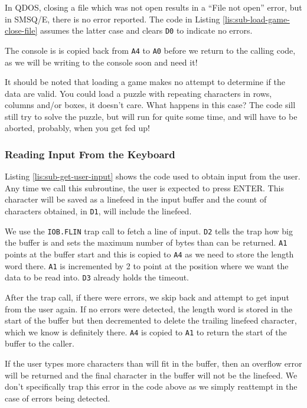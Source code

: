 In QDOS, closing a file which was not open results in a ``File not
open'' error, but in SMSQ/E, there is no error reported. The code
in Listing \ref{lis:sub-load-game-close-file} assumes the latter
case and clears \texttt{D0} to indicate no errors.

The console is is copied back from \texttt{A4} to \texttt{A0} before
we return to the calling code, as we will be writing to the console
soon and need it!

It should be noted that loading a game makes no attempt to determine
if the data are valid. You could load a puzzle with repeating characters
in rows, columns and/or boxes, it doesn't care. What happens in this
case? The code sill still try to solve the puzzle, but will run for
quite some time, and will have to be aborted, probably, when you get
fed up!

\subsubsection{Reading Input From the Keyboard}

Listing \ref{lis:sub-get-user-input} shows the code used to obtain
input from the user. Any time we call this subroutine, the user is
expected to press ENTER. This character will be saved as a linefeed
in the input buffer and the count of characters obtained, in \texttt{D1},
will include the linefeed.



We use the \texttt{IOB.FLIN} trap call to fetch a line of input. \texttt{D2}
tells the trap how big the buffer is and sets the maximum number of
bytes than can be returned. \texttt{A1} points at the buffer start
and this is copied to \texttt{A4} as we need to store the length word
there. \texttt{A1} is incremented by 2 to point at the position where
we want the data to be read into. \texttt{D3} already holds the timeout.

After the trap call, if there were errors, we skip back and attempt
to get input from the user again. If no errors were detected, the
length word is stored in the start of the buffer but then decremented
to delete the trailing linefeed character, which we know is definitely
there. \texttt{A4} is copied to \texttt{A1} to return the start of
the buffer to the caller.

If the user types more characters than will fit in the buffer, then
an overflow error will be returned and the final character in the
buffer will not be the linefeed. We don't specifically trap this error
in the code above as we simply reattempt in the case of errors being
detected.


